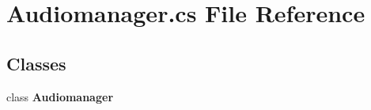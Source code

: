 \section{Audiomanager.\+cs File Reference}
\label{_audiomanager_8cs}
\subsection*{Classes}
\begin{DoxyCompactItemize}
\item 
class {\bf Audiomanager}
\end{DoxyCompactItemize}

